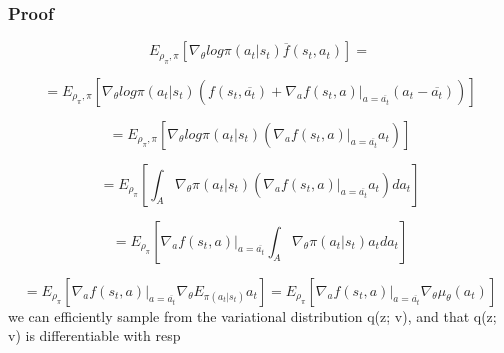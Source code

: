 \documentclass{beamer}
\begin{document}
\begin{frame}[t]
\frametitle{Proof}

\begin{equation}
 E_{\rho_\pi, \pi} \left[ \nabla_\theta log \pi(a_t | s_t) \overline{f} (s_t, a_t) \right] =
\end{equation}

\begin{equation}
= E_{\rho_\pi, \pi} \left[ \nabla_\theta log \pi(a_t | s_t) (f (s_t, \overline{a_t}) + 
\nabla_a f(s_t, a) |_{a=\overline{a_t}} (a_t - \overline{a_t})) \right]
\end{equation}

\begin{equation}
= E_{\rho_\pi, \pi} \left[ \nabla_\theta log \pi(a_t | s_t) ( 
\nabla_a f(s_t, a) |_{a=\overline{a_t}} a_t) \right]
\end{equation}

\begin{equation}
= E_{\rho_\pi} \left[ \int_{A} \nabla_\theta \pi(a_t | s_t) ( 
\nabla_a f(s_t, a) |_{a=\overline{a_t}} a_t) da_t \right]
\end{equation}

\begin{equation}
= E_{\rho_\pi} \left[ \nabla_a f(s_t, a) |_{a=\overline{a_t}} \int_{A} \nabla_\theta \pi(a_t | s_t) a_t da_t \right]
\end{equation}

\begin{equation}
= E_{\rho_\pi} \left[ \nabla_a f(s_t, a) |_{a=\overline{a_t}} \nabla_\theta E_{\pi(a_t | s_t)} a_t \right] = E_{\rho_\pi} \left[ \nabla_a f(s_t, a) |_{a=\overline{a_t}} \nabla_\theta \mu_\theta(a_t) \right]
\end{equation}we can efficiently sample from
the variational distribution q(z; v), and that q(z; v) is differentiable with resp

\end{frame}
\end{document}
